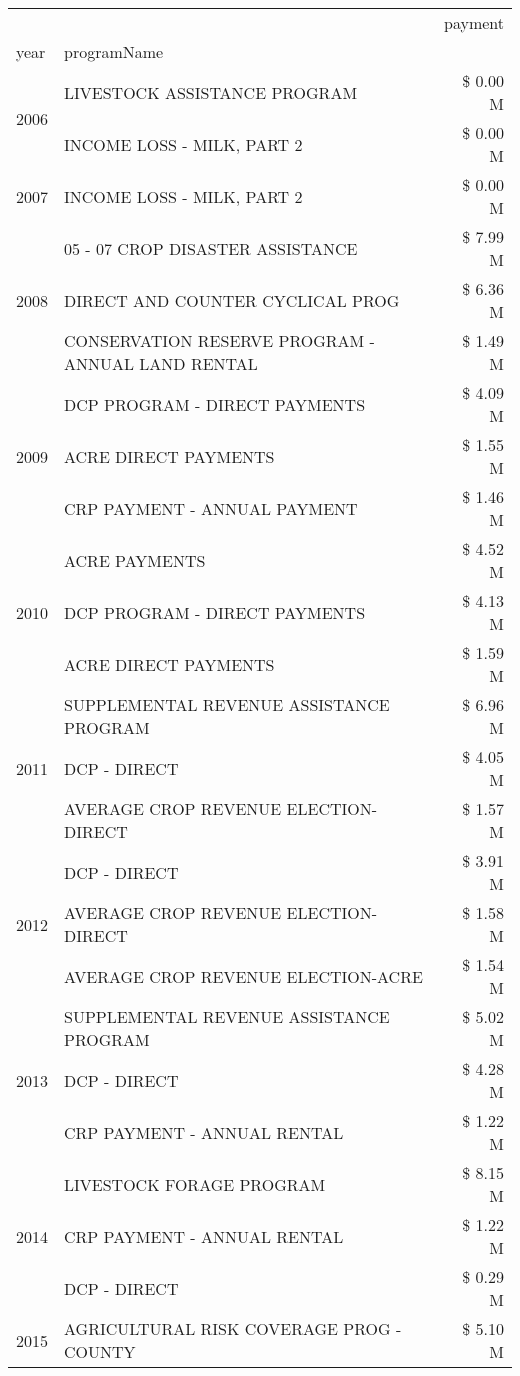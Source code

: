 \begin{tabular}{llr}
\toprule
 &  & payment \\
year & programName &  \\
\midrule
\multirow[t]{2}{*}{2006} & LIVESTOCK ASSISTANCE PROGRAM & \$ 0.00 M \\
 & INCOME LOSS - MILK, PART 2 & \$ 0.00 M \\
\cline{1-3}
2007 & INCOME LOSS - MILK, PART 2 & \$ 0.00 M \\
\cline{1-3}
\multirow[t]{3}{*}{2008} & 05 - 07 CROP DISASTER ASSISTANCE & \$ 7.99 M \\
 & DIRECT AND COUNTER CYCLICAL PROG & \$ 6.36 M \\
 & CONSERVATION RESERVE PROGRAM - ANNUAL LAND RENTAL & \$ 1.49 M \\
\cline{1-3}
\multirow[t]{3}{*}{2009} & DCP PROGRAM - DIRECT PAYMENTS & \$ 4.09 M \\
 & ACRE DIRECT PAYMENTS & \$ 1.55 M \\
 & CRP PAYMENT - ANNUAL PAYMENT & \$ 1.46 M \\
\cline{1-3}
\multirow[t]{3}{*}{2010} & ACRE PAYMENTS & \$ 4.52 M \\
 & DCP PROGRAM - DIRECT PAYMENTS & \$ 4.13 M \\
 & ACRE DIRECT PAYMENTS & \$ 1.59 M \\
\cline{1-3}
\multirow[t]{3}{*}{2011} & SUPPLEMENTAL REVENUE ASSISTANCE PROGRAM & \$ 6.96 M \\
 & DCP - DIRECT & \$ 4.05 M \\
 & AVERAGE CROP REVENUE ELECTION-DIRECT & \$ 1.57 M \\
\cline{1-3}
\multirow[t]{3}{*}{2012} & DCP - DIRECT & \$ 3.91 M \\
 & AVERAGE CROP REVENUE ELECTION-DIRECT & \$ 1.58 M \\
 & AVERAGE CROP REVENUE ELECTION-ACRE & \$ 1.54 M \\
\cline{1-3}
\multirow[t]{3}{*}{2013} & SUPPLEMENTAL REVENUE ASSISTANCE PROGRAM & \$ 5.02 M \\
 & DCP - DIRECT & \$ 4.28 M \\
 & CRP PAYMENT - ANNUAL RENTAL & \$ 1.22 M \\
\cline{1-3}
\multirow[t]{3}{*}{2014} & LIVESTOCK FORAGE PROGRAM & \$ 8.15 M \\
 & CRP PAYMENT - ANNUAL RENTAL & \$ 1.22 M \\
 & DCP - DIRECT & \$ 0.29 M \\
\cline{1-3}
\multirow[t]{3}{*}{2015} & AGRICULTURAL RISK COVERAGE PROG - COUNTY & \$ 5.10 M \\

\end{tabular}
